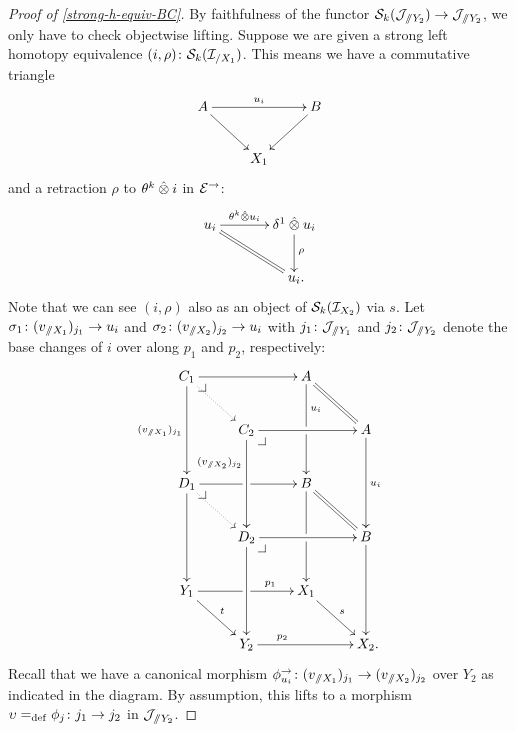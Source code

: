 \documentclass[reqno,10pt,a4paper,oneside,draft]{amsart}
\begin{document}
\begin{proof}[Proof of \cref{strong-h-equiv-BC}]
By faithfulness of the functor $\cal{S}_k(\cal{J}_{\fakeslice Y_2} )\to \cal{J}_{\fakeslice Y_2}$, we only have to check objectwise lifting.
Suppose we are given a strong left homotopy equivalence $(i, \rho) \co \cal{S}_k(\cal{I}_{/X_1})$.
This means we have a commutative triangle
\[
\xymatrix{
  A
  \ar[rr]^{u_i}
  \ar[dr]
&&
  B
  \ar[dl]
\\&
  X_1
}
\]
and a retraction $\rho$ to $\thetak \hatotimes i$ in $\catE^\to$:
\[
\xymatrix@C+1em{
  u_i
  \ar[r]^-{\thetak \hatotimes u_i}
  \ar@{=}[dr]
&
  \rcyl \hatotimes u_i \ar[d]^{\rho}
\\&
  u_i
\rlap{.}}
\]
Note that we can see $(i, \rho)$ also as an object of $\cal{S}_k(\cal{I}_{X_2})$ via $s$.
Let $\sigma_1 \co (v_{\fakeslice X_1})_{j_1} \to u_i$ and $\sigma_2 \co (v_{\fakeslice X_2})_{j_2} \to u_i$ with $j_1 \co \cal{J}_{\fakeslice Y_1}$ and $j_2 \co \cal{J}_{\fakeslice Y_2}$ denote the base changes of $i$ over along $p_1$ and $p_2$, respectively:
\[
\xymatrix{
  C_1
  \ar[rr]
  \ar[dd]_{(v_{\fakeslice X_1})_{j_1}}
  \pullback{dr}
  \ar@{.>}[dr]
&&
  A
  \ar[dd]^(0.3){u_i}|!{[dl];[dr]}{\hole}
  \ar@{=}[dr]
\\&
  C_2
  \ar[rr]
  \ar[dd]_(0.3){(v_{\fakeslice X_2})_{j_2}}
  \pullback{dr}
&&
  A
  \ar[dd]^{u_i}
\\
  D_1
  \ar[rr]|!{[dr];[ur]}{\hole}
  \ar[dd]
  \pullback{dr}
  \ar@{.>}[dr]
&&
  B
  \ar[dd]|!{[dl];[dr]}{\hole}
  \ar@{=}[dr]
\\&
  D_2
  \ar[rr]
  \ar[dd]
  \pullback{dr}
&&
  B
  \ar[dd]
\\
  Y_1
  \ar[rr]^(0.7){p_1}|!{[dr];[ur]}{\hole}
  \ar[dr]^{t}
&&
  X_1
  \ar[dr]^{s}
\\&
  Y_2
  \ar[rr]^(0.3){p_2}
&&
  X_2
\rlap{.}}
\]
Recall that we have a canonical morphism $\phi_{u_i}^\to \co (v_{\fakeslice X_1})_{j_1} \to (v_{\fakeslice X_2})_{j_2}$ over $Y_2$ as indicated in the diagram.
By assumption, this lifts to a morphism $\upsilon \defeq \phi_j \co j_1 \to j_2$ in $\cal{J}_{\fakeslice Y_2}$.


\end{proof}
\end{document}

